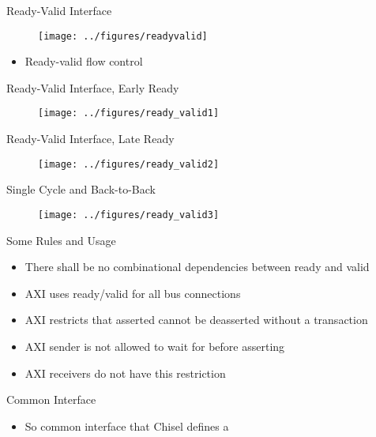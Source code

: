 \begin{frame}[fragile]{Ready-Valid Interface}
\begin{figure}
  \texttt{[image: ../figures/readyvalid]}
\end{figure}
\begin{itemize}
\item Ready-valid flow control
\end{itemize}
\end{frame}

\begin{frame}[fragile]{Ready-Valid Interface, Early Ready}
\begin{figure}
  \texttt{[image: ../figures/ready\_valid1]}
\end{figure}
\end{frame}

\begin{frame}[fragile]{Ready-Valid Interface, Late Ready}
\begin{figure}
  \texttt{[image: ../figures/ready\_valid2]}
\end{figure}
\end{frame}

\begin{frame}[fragile]{Single Cycle and Back-to-Back}
\begin{figure}
  \texttt{[image: ../figures/ready\_valid3]}
\end{figure}
\end{frame}

\begin{frame}[fragile]{Some Rules and Usage}
\begin{itemize}
\item There shall be no combinational dependencies between ready and valid
\item AXI uses ready/valid for all bus connections
\item AXI restricts that  asserted cannot be deasserted without a transaction
\item AXI sender is not allowed to wait for  before asserting 
\item AXI receivers do not have this restriction
\end{itemize}
\end{frame}


\begin{frame}[fragile]{Common Interface}
\begin{itemize}
\item So common interface that Chisel defines a 
\end{itemize}
\end{frame}

